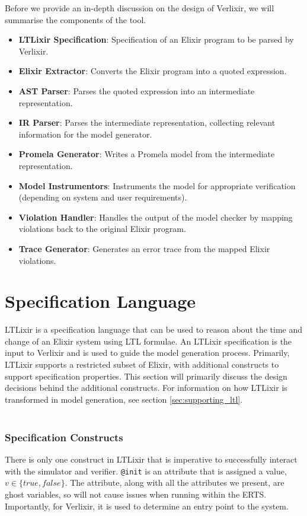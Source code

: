 Before we provide an in-depth discussion on the design of Verlixir, we will summarise the components of the tool.
\begin{itemize}
    \item \textbf{LTLixir Specification}: Specification of an Elixir program to be parsed by Verlixir.
    \item \textbf{Elixir Extractor}: Converts the Elixir program into a quoted expression.
    \item \textbf{AST Parser}: Parses the quoted expression into an intermediate representation.
    \item \textbf{IR Parser}: Parses the intermediate representation, collecting relevant information for the model generator.
    \item \textbf{Promela Generator}: Writes a Promela model from the intermediate representation.
    \item \textbf{Model Instrumentors}: Instruments the model for appropriate verification (depending on system and user requirements).
    \item \textbf{Violation Handler}: Handles the output of the model checker by mapping violations back to the original Elixir program.
    \item \textbf{Trace Generator}: Generates an error trace from the mapped Elixir violations.
\end{itemize}
\section{Specification Language} \label{sec:specification_language}
LTLixir is a specification language that can be used to reason about the time and change of an Elixir system using LTL formulae. An LTLixir specification is the input to Verlixir and is used to guide the model generation process. Primarily, LTLixir supports a restricted subset of Elixir, with additional constructs to support specification properties. This section will primarily discuss the design decisions behind the additional constructs. For information on how LTLixir is transformed in model generation, see section \ref{sec:supporting_ltl}.
\\ \\
\subsubsection{Specification Constructs}
There is only one construct in LTLixir that is imperative to successfully interact with the simulator and verifier. \texttt{@init} is an attribute that is assigned a value, $v \in \{true, false\}$. The attribute, along with all the attributes we present, are ghost variables, so will not cause issues when running within the ERTS. Importantly, for Verlixir, it is used to determine an entry point to the system.
\\ \\

